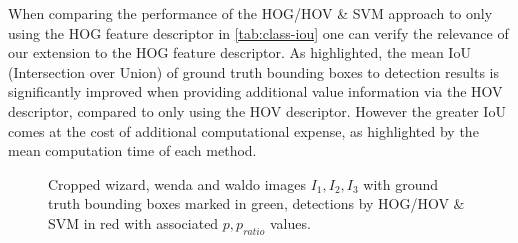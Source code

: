 \documentclass[11pt]{article}
\begin{document}
When comparing the performance of the HOG/HOV \& SVM approach to only using the HOG feature descriptor in \autoref{tab:class-iou}
one can verify the relevance of our extension to the HOG feature descriptor. As highlighted, the mean IoU (Intersection over Union) 
of ground truth bounding boxes to detection results is significantly improved when providing additional value information via the HOV descriptor, 
compared to only using the HOV descriptor.
However the greater IoU comes at the cost of additional computational expense, as highlighted by the mean computation time of each method.


\begin{figure}
    \centering
    \begin{subfigure}{0.3\linewidth}
    \end{subfigure}
    \begin{subfigure}{0.3\linewidth}
    \end{subfigure}
    \begin{subfigure}{0.3\linewidth}
    \end{subfigure}
    \caption{Cropped wizard, wenda and waldo images \( I_1, I_2, I_3 \) with ground truth bounding boxes marked in green, 
    detections by HOG/HOV \& SVM in red with associated \( p, p_{ratio} \) values.}
    \label{fig:detections}
\end{figure}
\end{document}
